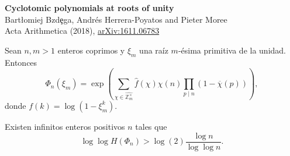 \documentclass[10pt,compress]{beamer}
\begin{document}
\begin{frame}
  \begin{tcolorbox}[colback=ChetwodeBlue!10,colframe=ChetwodeBlue!60]
    \begin{center}
      \vspace*{-1mm} {
        \color{TurkishRose}\textbf{Cyclotomic polynomials at roots of unity}} \\
      Bart{\l}omiej Bzd\c{e}ga, Andr\'es Herrera-Poyatos and Pieter Moree\\
      Acta Arithmetica (2018), \href{https://arxiv.org/abs/1611.06783}{arXiv:1611.06783}
    \end{center}
    \vspace*{-6mm}
  \end{tcolorbox}

  \begin{theorem}
    Sean $n,m > 1$ enteros coprimos y $\xi_m$ una raíz $m$-ésima primitiva de la unidad. Entonces
    \vspace*{-3mm}
    \begin{equation*}
      \Phi_n(\xi_m) =
      \exp\left(\sum_{\chi\in\widehat{\mathbb{Z}_m^{\times}}} \hat{f}(\chi)\chi(n)\prod_{p\mid
          n}(1-\overline{\chi}(p))\right),
    \end{equation*}
    donde $f(k) = \log(1 - \xi_m^k)$.
  \end{theorem}

  \begin{theorem}
    Existen infinitos enteros positivos $n$ tales que \vspace{-2mm}
    \[ \log\log H(\Phi_n) > \log(2) \frac{\log n}{\log\log n}. \] \vspace{-4mm}
  \end{theorem}
\end{frame}
\end{document}

